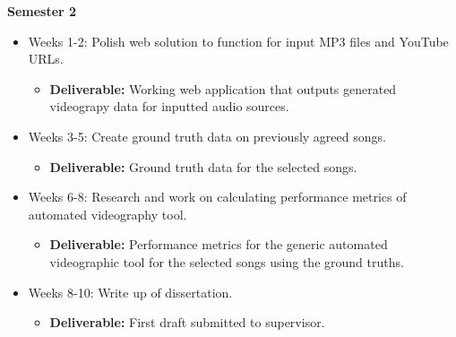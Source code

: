 \documentclass[11pt]{article}
\begin{document}
\noindent \textbf{Semester 2}

\noindent
\begin{itemize}[noitemsep]
    \item Weeks 1-2: Polish web solution to function for input MP3 files and YouTube URLs.
    \begin{itemize}
        \item \textbf{Deliverable:} Working web application that outputs generated videograpy data for inputted audio sources.
    \end{itemize}
    \item Weeks 3-5: Create ground truth data on previously agreed songs.
    \begin{itemize}
        \item \textbf{Deliverable:} Ground truth data for the selected songs.
    \end{itemize}
    \item Weeks 6-8: Research and work on calculating performance metrics of automated videography tool.
    \begin{itemize}
        \item \textbf{Deliverable:} Performance metrics for the generic automated videographic tool for the selected songs using the ground truths.
    \end{itemize}
    \item Weeks 8-10: Write up of dissertation.
    \begin{itemize}
        \item \textbf{Deliverable:} First draft submitted to supervisor.
    \end{itemize}
\end{itemize}
\end{document}
